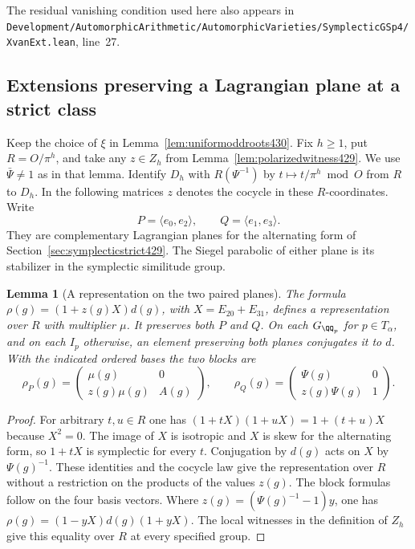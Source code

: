 \documentclass[a4paper,11pt]{article}
\newtheorem{lemma}[proposition]{Lemma}
\theoremstyle{definition}
\theoremstyle{remark}
\newcommand{\srcloc}[2]{{\small\nolinkurl{#1.lean}}, line~#2}
\numberwithin{equation}{section}
\begin{document}
The residual vanishing condition used here also appears in
\srcloc{Development/AutomorphicArithmetic/AutomorphicVarieties/SymplecticGSp4/XvanExt}{27}.


\subsection{Extensions preserving a Lagrangian plane at a strict class}
\label{sec:strictsiegelplanes431}

Keep the choice of \(\xi\) in Lemma~\ref{lem:uniformoddroots430}.
Fix \(h\ge1\), put \(R=O/\pi^h\), and take any
\(z\in Z_h\) from Lemma~\ref{lem:polarizedwitness429}.
We use \(\bar\Psi\ne1\) as in that lemma. Identify \(D_h\)
with \(R(\Psi^{-1})\) by \(t\mapsto t/\pi^h\bmod O\) from
\(R\) to \(D_h\). In the following matrices \(z\) denotes
the cocycle in these \(R\)-coordinates. Write
\[
  P=\langle e_0,e_2\rangle,\qquad Q=\langle e_1,e_3\rangle .
\]
They are complementary Lagrangian planes for the alternating
form of Section~\ref{sec:symplecticstrict429}. The Siegel
parabolic of either plane is its stabilizer in the symplectic
similitude group.

\begin{lemma}[A representation on the two paired planes]\leavevmode
\label{lem:strictblock431}
The formula \(\rho(g)=(1+z(g)X)d(g)\), with
\(X=E_{20}+E_{31}\), defines a representation over \(R\)
with multiplier \(\mu\). It preserves both \(P\) and \(Q\).
On each \(G_{\QQ_p}\) for \(p\in T_\alpha\), and on each
\(I_p\) otherwise, an element preserving both planes
conjugates it to \(d\). With the indicated ordered bases
the two blocks are
\[
  \rho_P(g)=\begin{pmatrix}\mu(g)&0\\z(g)\mu(g)&A(g)\end{pmatrix},
  \qquad
  \rho_Q(g)=\begin{pmatrix}\Psi(g)&0\\z(g)\Psi(g)&1\end{pmatrix}.
\]
\end{lemma}
\begin{proof}
For arbitrary \(t,u\in R\) one has \((1+tX)(1+uX)=1+(t+u)X\)
because \(X^2=0\). The image of \(X\) is isotropic and \(X\)
is skew for the alternating form, so \(1+tX\) is symplectic
for every \(t\). Conjugation by \(d(g)\) acts on \(X\) by
\(\Psi(g)^{-1}\). These identities and the cocycle law give
the representation over \(R\) without a restriction on the
products of the values \(z(g)\). The block formulas follow on
the four basis vectors. Where \(z(g)=(\Psi(g)^{-1}-1)y\), one
has \(\rho(g)=(1-yX)d(g)(1+yX)\). The local witnesses in the
definition of \(Z_h\) give this equality over \(R\) at every
specified group.
\end{proof}
\end{document}
